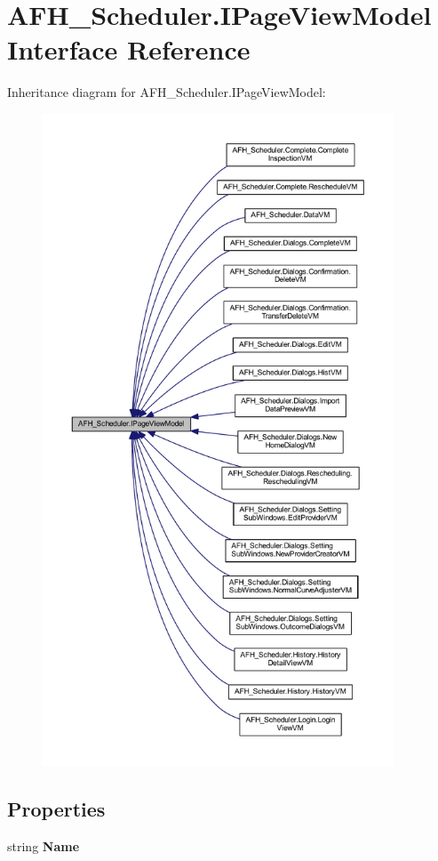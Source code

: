 \section{A\+F\+H\+\_\+\+Scheduler.\+I\+Page\+View\+Model Interface Reference}
\label{interface_a_f_h___scheduler_1_1_i_page_view_model}


Inheritance diagram for A\+F\+H\+\_\+\+Scheduler.\+I\+Page\+View\+Model\+:
\nopagebreak
\begin{figure}[H]
\begin{center}
\leavevmode
\includegraphics[height=550pt]{interface_a_f_h___scheduler_1_1_i_page_view_model__inherit__graph}
\end{center}
\end{figure}
\subsection*{Properties}
\begin{DoxyCompactItemize}
\item 
string \textbf{ Name}\hspace{0.3cm}{\ttfamily  [get]}
\end{DoxyCompactItemize}


